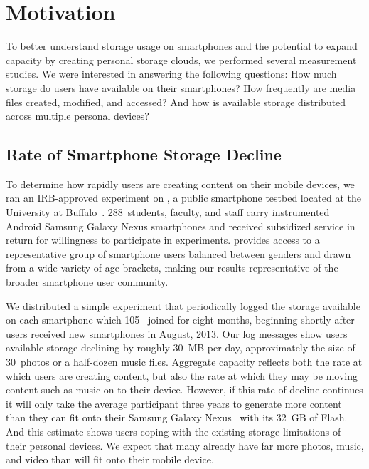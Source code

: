 
\section{Motivation}
\label{sec-motivation}

To better understand storage usage on smartphones and the potential to expand
capacity by creating personal storage clouds, we performed several
measurement studies. We were interested in answering the following questions:
How much storage do users have available on their smartphones? How frequently
are media files created, modified, and accessed? And how is available storage
distributed across multiple personal devices?

\subsection{Rate of Smartphone Storage Decline}

To determine how rapidly users are creating content on their mobile devices,
we ran an IRB-approved experiment on \PhoneLab{}, a public smartphone testbed
located at the University at Buffalo~\cite{nandugudi2013phonelab}.
288~students, faculty, and staff carry instrumented Android Samsung Galaxy
Nexus smartphones and received subsidized service in return for willingness
to participate in experiments. \PhoneLab{} provides access to a
representative group of smartphone users balanced between genders and drawn
from a wide variety of age brackets, making our results representative of the
broader smartphone user community.

We distributed a simple experiment that periodically logged the storage
available on each smartphone which 105~\PhoneLab{} joined for eight months,
beginning shortly after \PhoneLab{} users received new smartphones in August,
2013. Our log messages show users available storage declining by roughly
30~MB per day, approximately the size of 30~photos or a half-dozen music
files. Aggregate capacity reflects both the rate at which users are creating
content, but also the rate at which they may be moving content such as music
on to their device. However, if this rate of decline continues it will only
take the average \PhoneLab{} participant three years to generate more content
than they can fit onto their Samsung Galaxy Nexus~\cite{galaxynexus} with its
32~GB of Flash. And this estimate shows users coping with the existing
storage limitations of their personal devices. We expect that many already
have far more photos, music, and video than will fit onto their mobile
device.

